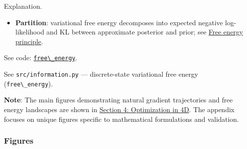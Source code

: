 \documentclass[
  10pt,
]{article}
\newcommand{\passthrough}[1]{#1}
\providecommand{\tightlist}{%
  \setlength{\itemsep}{0pt}\setlength{\parskip}{0pt}}
\begin{document}
Explanation.

\begin{itemize}
\tightlist
\item
  \textbf{Partition}: variational free energy decomposes into expected
  negative log-likelihood and KL between approximate posterior and
  prior; see
  \href{https://en.wikipedia.org/wiki/Free_energy_principle}{Free energy
  principle}.
\end{itemize}

See code:
\href{03_quadray_methods.md\#code:free_energy}{\passthrough{\lstinline!free\_energy!}}.

See \passthrough{\lstinline!src/information.py!} --- discrete-state
variational free energy (\passthrough{\lstinline!free\_energy!}).

\textbf{Note}: The main figures demonstrating natural gradient
trajectories and free energy landscapes are shown in
\href{04_optimization_in_4d.md}{Section 4: Optimization in 4D}. The
appendix focuses on unique figures specific to mathematical formulations
and validation.

\hypertarget{figures-2}{%
\subsubsection{Figures}\label{figures-2}}
\end{document}
